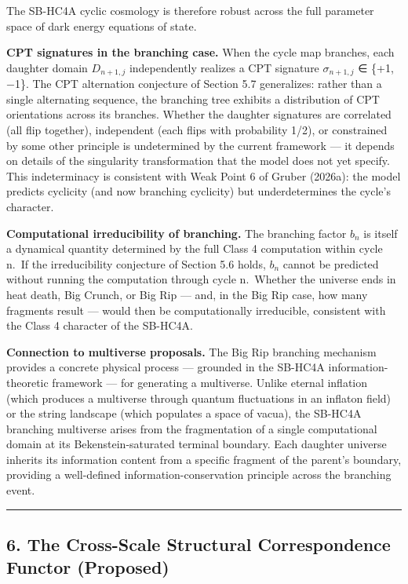 \documentclass[
]{article}
\begin{document}
The SB-HC4A cyclic cosmology is therefore robust across the full
parameter space of dark energy equations of state.

\textbf{CPT signatures in the branching case.} When the cycle map
branches, each daughter domain \(D_{n+1,j}\) independently realizes a
CPT signature \(\sigma_{n+1,j}\) ∈ \{+1, −1\}. The CPT alternation
conjecture of Section 5.7 generalizes: rather than a single alternating
sequence, the branching tree exhibits a distribution of CPT orientations
across its branches. Whether the daughter signatures are correlated (all
flip together), independent (each flips with probability 1/2), or
constrained by some other principle is undetermined by the current
framework --- it depends on details of the singularity transformation
that the model does not yet specify. This indeterminacy is consistent
with Weak Point 6 of Gruber (2026a): the model predicts cyclicity (and
now branching cyclicity) but underdetermines the cycle's character.

\textbf{Computational irreducibility of branching.} The branching factor
\(b_{n}\) is itself a dynamical quantity determined by the full Class 4
computation within cycle n.~If the irreducibility conjecture of Section
5.6 holds, \(b_{n}\) cannot be predicted without running the computation
through cycle n.~Whether the universe ends in heat death, Big Crunch, or
Big Rip --- and, in the Big Rip case, how many fragments result ---
would then be computationally irreducible, consistent with the Class 4
character of the SB-HC4A.

\textbf{Connection to multiverse proposals.} The Big Rip branching
mechanism provides a concrete physical process --- grounded in the
SB-HC4A information-theoretic framework --- for generating a multiverse.
Unlike eternal inflation (which produces a multiverse through quantum
fluctuations in an inflaton field) or the string landscape (which
populates a space of vacua), the SB-HC4A branching multiverse arises
from the fragmentation of a single computational domain at its
Bekenstein-saturated terminal boundary. Each daughter universe inherits
its information content from a specific fragment of the parent's
boundary, providing a well-defined information-conservation principle
across the branching event.

\begin{center}\rule{0.5\linewidth}{0.5pt}\end{center}

\hypertarget{the-cross-scale-structural-correspondence-functor-proposed}{%
\subsection{6. The Cross-Scale Structural Correspondence Functor
(Proposed)}\label{the-cross-scale-structural-correspondence-functor-proposed}}
\end{document}
